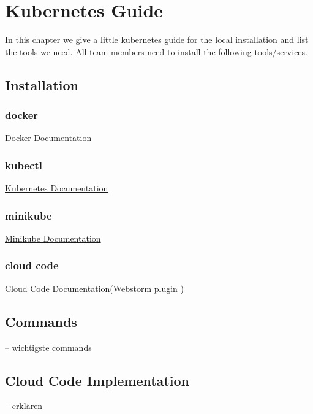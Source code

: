 \chapter{Kubernetes Guide}

In this chapter we give a little kubernetes guide for the local installation and list the tools we need. All team members need to install the following tools/services.

\section{Installation}
\subsection{docker}
\href{https://docs.docker.com/get-docker/}{Docker Documentation}

\subsection{kubectl}
\href{https://kubernetes.io/docs/tasks/tools/#kubectl}{Kubernetes Documentation}

\subsection{minikube}
\href{https://minikube.sigs.k8s.io/docs/start/}{Minikube Documentation}

\subsection{cloud code}
\href{https://plugins.jetbrains.com/plugin/8079-cloud-code/}{Cloud Code Documentation(Webstorm plugin
)}

\section{Commands}
-- wichtigste commands

\section{Cloud Code Implementation}
-- erklären